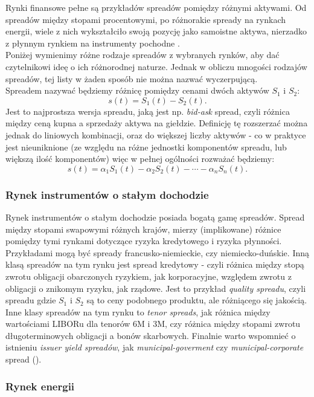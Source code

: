 Rynki finansowe pełne są przykładów spreadów pomiędzy różnymi aktywami. Od spreadów między stopami procentowymi, po różnorakie spready na rynkach energii, wiele z nich wykształciło swoją pozycję jako samoistne aktywa, nierzadko z płynnym rynkiem na instrumenty pochodne \cite{Carmona_Spread_Options}.\\
Poniżej wymienimy różne rodzaje spreadów z wybranych rynków, aby dać czytelnikowi ideę o ich różnorodnej naturze. Jednak w obliczu mnogości rodzajów spreadów, tej listy w żaden sposób nie można nazwać wyczerpującą.\\

Spreadem nazywać będziemy różnicę pomiędzy cenami dwóch aktywów $S_1$ i $S_2$:
$$ s(t) = S_1(t) - S_2(t).$$
Jest to najprostsza wersja spreadu, jaką jest np. \emph{bid-ask} spread, czyli różnica między ceną kupna a sprzedaży aktywa na giełdzie. Definicję tę rozszerzać można jednak do liniowych kombinacji, oraz do większej liczby aktywów - co w praktyce jest nieuniknione (ze względu na różne jednostki komponentów spreadu, lub większą ilość komponentów) więc w pełnej ogólności rozważać będziemy:
$$ s(t) = \alpha_1S_1(t) - \alpha_2S_2(t) - \cdots -\alpha_nS_n(t).$$

\subsubsection{Rynek instrumentów o stałym dochodzie}

Rynek instrumentów o stałym dochodzie posiada bogatą gamę spreadów. Spread między stopami swapowymi różnych krajów, mierzy (implikowane) różnice pomiędzy tymi rynkami dotyczące ryzyka kredytowego i ryzyka płynności. Przykładami mogą być spready francusko-niemieckie, czy niemiecko-duńskie. Inną klasą spreadów na tym rynku jest spread kredytowy - czyli różnica między stopą zwrotu obligacji obarczonych ryzykiem, jak korporacyjne, względem zwrotu z obligacji o znikomym ryzyku, jak rządowe. Jest to przykład \emph{quality spreadu}, czyli spreadu gdzie $S_1$ i $S_2$ są to ceny podobnego produktu, ale różniącego się jakością.\\
Inne klasy spreadów na tym rynku to \emph{tenor spreads}, jak różnica między wartościami LIBORu dla tenorów 6M i 3M, czy różnica między stopami zwrotu długoterminowych obligacji a bonów skarbowych. Finalnie warto wspomnieć o istnieniu \emph{issuer yield spreadów}, jak \emph{municipal-goverment} czy \emph{municipal-corporate} spread (\cite{Fixed_Income}).


\subsubsection{Rynek energii}

